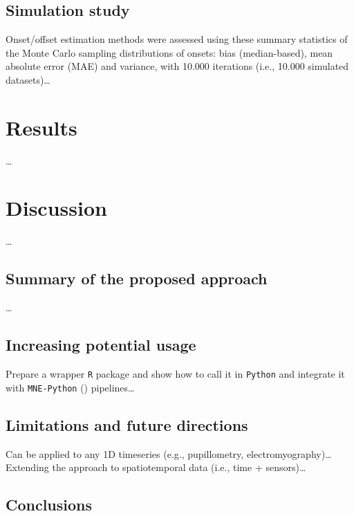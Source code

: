 \documentclass[
  doc,
  floatsintext,
  longtable,
  a4paper,
  nolmodern,
  notxfonts,
  notimes,
  colorlinks=true,linkcolor=blue,citecolor=blue,urlcolor=blue]{apa7}
\begin{document}
\subsection{Simulation study}\label{simulation-study}

Onset/offset estimation methods were assessed using these summary
statistics of the Monte Carlo sampling distributions of onsets: bias
(median-based), mean absolute error (MAE) and variance, with 10.000
iterations (i.e., 10.000 simulated datasets)\ldots{}

\newpage

\section{Results}\label{results}

\ldots{}

\newpage

\section{Discussion}\label{discussion}

\ldots{}

\subsection{Summary of the proposed
approach}\label{summary-of-the-proposed-approach}

\ldots{}

\subsection{Increasing potential
usage}\label{increasing-potential-usage}

Prepare a wrapper \texttt{R} package and show how to call it in
\texttt{Python} and integrate it with \texttt{MNE-Python}
() pipelines\ldots{}

\subsection{Limitations and future
directions}\label{limitations-and-future-directions}

Can be applied to any 1D timeseries (e.g., pupillometry,
electromyography)\ldots{} Extending the approach to spatiotemporal data
(i.e., time + sensors)\ldots{}

\subsection{Conclusions}\label{conclusions}
\end{document}
